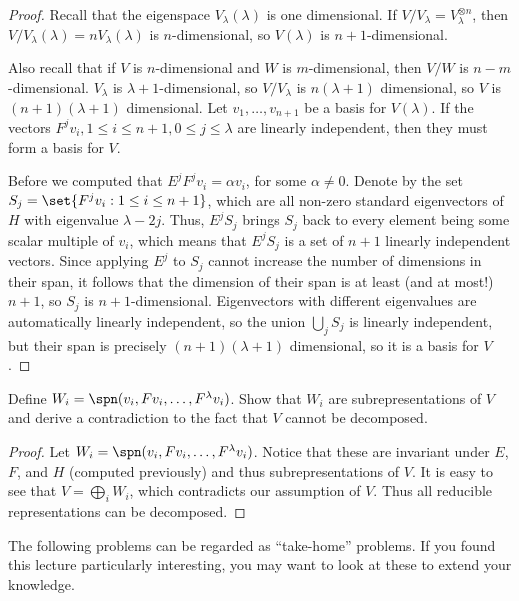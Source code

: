 \documentclass{article}
\begin{document}
\begin{proof}
Recall that the eigenspace $V_{\lambda}(\lambda)$ is one dimensional. If $V /
V_{\lambda} = V_{\lambda}^{\otimes n}$, then $V / V_{\lambda} (\lambda) = n
V_{\lambda} (\lambda)$ is $n$-dimensional, so $V(\lambda)$ is $n +
1$-dimensional.

Also recall that if $V$ is $n$-dimensional and $W$ is $m$-dimensional, then $V /
W$ is $n - m$-dimensional. $V_{\lambda}$ is $\lambda + 1$-dimensional, so $V /
V_{\lambda}$ is $n (\lambda + 1)$ dimensional, so $V$ is $(n + 1)(\lambda + 1)$
dimensional. Let $v_1, \dots, v_{n + 1}$ be a basis for $V(\lambda)$. If the
vectors $F^j v_i, 1 \leq i \leq n + 1, 0 \leq j \leq \lambda$ are linearly
independent, then they must form a basis for $V$.

Before we computed that $E^j F^j v_i = \alpha v_i$, for some $\alpha \neq 0$.
Denote by the set $S_j = \set{F^j v_i : 1 \leq i \leq n + 1}$, which are all
non-zero standard eigenvectors of $H$ with eigenvalue $\lambda - 2j$. Thus, $E^j
S_j$ brings $S_j$ back to every element being some scalar multiple of $v_i$,
which means that $E^j S_j$ is a set of $n + 1$ linearly independent vectors.
Since applying $E^j$ to $S_j$ cannot increase the number of dimensions in their
span, it follows that the dimension of their span is at least (and at most!) $n
+ 1$, so $S_j$ is $n + 1$-dimensional. Eigenvectors with different eigenvalues
are automatically linearly independent, so the union $\bigcup_j S_j$ is linearly
independent, but their span is precisely $(n + 1)(\lambda + 1)$ dimensional, so
it is a basis for $V$.
\end{proof}

\begin{prb}
Define $W_i = \spn(v_i, Fv_i, \dots, F^{\lambda} v_i)$. Show that $W_i$ are
subrepresentations of $V$ and derive a contradiction to the fact that $V$ cannot
be decomposed.
\end{prb}

\begin{proof}
Let $W_i = \spn(v_i, F v_i, \dots, F^{\lambda} v_i)$. Notice that these are
invariant under $E$, $F$, and $H$ (computed previously) and thus
subrepresentations of $V$. It is easy to see that $V = \bigoplus_i W_i$, which
contradicts our assumption of $V$. Thus all reducible representations can be
decomposed.
\end{proof}

\newpage
The following problems can be regarded as ``take-home'' problems. If you found
this lecture particularly interesting, you may want to look at these to extend
your knowledge.
\end{document}
